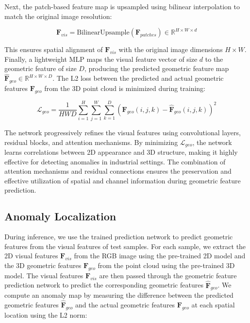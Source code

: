 \noindent Next, the patch-based feature map is upsampled using bilinear interpolation to match the original image resolution:

\begin{equation}
    \mathbf{F}_{vis} = \text{BilinearUpsample}(\mathbf{F}_{patches}) \in \mathbb{R}^{H \times W \times d}
\end{equation}

\noindent This ensures spatial alignment of $\mathbf{F}_{vis}$ with the original image dimensions $H \times W$. Finally, a lightweight MLP maps the visual feature vector of size $d$ to the geometric feature of size $D$, producing the predicted geometric feature map $\hat{\mathbf{F}}_{geo} \in \mathbb{R}^{H \times W \times D}$. The L2 loss between the predicted and actual geometric features $\mathbf{F}_{geo}$ from the 3D point cloud is minimized during training:

\begin{equation}
\mathcal{L}_{geo} = \frac{1}{HWD} \sum_{i=1}^{H} \sum_{j=1}^{W} \sum_{k=1}^{D} \left( \mathbf{F}_{geo}(i, j, k) - \hat{\mathbf{F}}_{geo}(i, j, k) \right)^2
\end{equation}

\noindent The network progressively refines the visual features using convolutional layers, residual blocks, and attention mechanisms. By minimizing $\mathcal{L}_{geo}$, the network learns correlations between 2D appearance and 3D structure, making it highly effective for detecting anomalies in industrial settings. The combination of attention mechanisms and residual connections ensures the preservation and effective utilization of spatial and channel information during geometric feature prediction.

\subsection*{Anomaly Localization}

During inference, we use the trained prediction network to predict geometric features from the visual features of test samples. For each sample, we extract the 2D visual features $\mathbf{F}_{vis}$ from the RGB image using the pre-trained 2D model and the 3D geometric features $\mathbf{F}_{geo}$ from the point cloud using the pre-trained 3D model. The visual features $\mathbf{F}_{vis}$ are then passed through the geometric feature prediction network to predict the corresponding geometric features $\hat{\mathbf{F}}_{geo}$. We compute an anomaly map by measuring the difference between the predicted geometric features $\hat{\mathbf{F}}_{geo}$ and the actual geometric features $\mathbf{F}_{geo}$ at each spatial location using the L2 norm:

